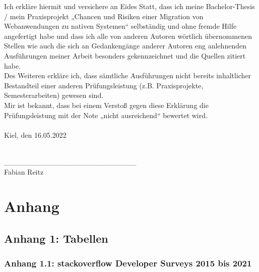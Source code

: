 \documentclass[a4paper]{scrartcl}
\begin{document}

\onehalfspacing

Ich erkläre hiermit und versichere an Eides Statt, dass ich meine Bachelor-Thesis / mein Praxisprojekt „Chancen und Risiken einer Migration von Webanwendungen zu nativen Systemen“ selbständig und ohne fremde Hilfe angefertigt habe und dass ich alle von anderen Autoren wörtlich übernommenen Stellen wie auch die sich an Gedankengänge anderer Autoren eng anlehnenden Ausführungen meiner Arbeit besonders gekennzeichnet und die Quellen zitiert habe. \\
Des Weiteren erkläre ich, dass sämtliche Ausführungen nicht bereits inhaltlicher Bestandteil einer anderen Prüfungsleistung (z.B. Praxisprojekte, Semesterarbeiten) gewesen sind. \\
Mir ist bekannt, dass bei einem Verstoß gegen diese Erklärung die Prüfungsleistung mit der Note „nicht ausreichend“ bewertet wird. \\ \\

Kiel, den 16.05.2022 \\ \\ 

\begin{tabbing}
	\_\_\_\_\_\_\_\_\_\_\_\_\_\_\_\_\_\_\_\_\_\_\_\_\_ \\
	Fabian Reitz
\end{tabbing}


\newpage

\appendix

\section*{Anhang}

\subsection*{Anhang 1: Tabellen}

\subsubsection*{Anhang 1.1: stackoverflow Developer Surveys 2015 bis 2021}
\end{document}
